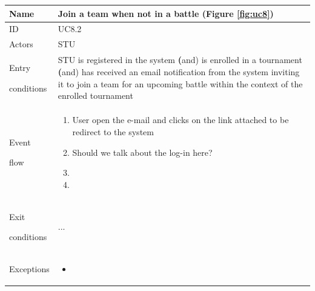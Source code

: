 \begin{center}
    \def\arraystretch{1.5}
    \begin{tabular}{| m{2cm} | m{10cm}|}
        \hline
        Name                  & Join a team when not in a battle (Figure \ref{fig:uc8}) \\ \hline
        ID                    & UC8.2                                   \\ \hline
        Actors                & STU                                   \\ \hline
        Entry \par conditions & STU is registered in the system 
                                    \textbf(and) is enrolled in a tournament 
                                    \textbf(and) has received an email notification from the system inviting it to join a team for an upcoming battle within the context of the enrolled tournament                                     \\ \hline
        Event \par flow       & \begin{enumerate}
                                    \item User open the e-mail and clicks on the link attached to be redirect to the system
                                    \item {\color{red} Should we talk about the log-in here?}
                                    \item 
                                    \item
                                \end{enumerate}                      \\ \hline
        Exit \par conditions  & ...                                   \\ \hline
        Exceptions            & \begin{itemize}
                                    \item
                                \end{itemize}                        \\ \hline
    \end{tabular}
\end{center}

